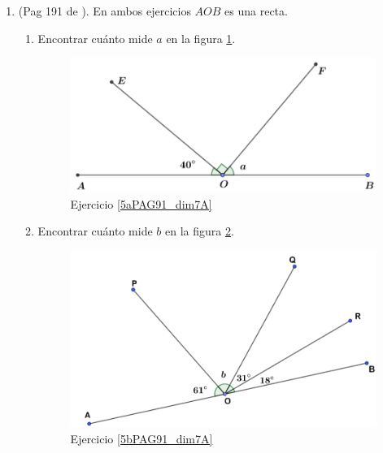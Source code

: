 \begin{enumerate}
	\item (Pag 191 de \cite{Dimensions_Math_7A}). En ambos ejercicios $AOB$ es una recta.
	\begin{enumerate}[label=\Alph*) ]
		\item \label{5aPAG91_dim7A}Encontrar cuánto mide $a$ en la figura \ref{dimensions_7A_p191_5a}.
		\begin{figure}[H]
			\centering
			\includegraphics[width=0.6\linewidth]{Geometria/imgs/dimensions_7A_p191_5a}
			\caption{Ejercicio \ref{5aPAG91_dim7A}}
			\label{dimensions_7A_p191_5a}
		\end{figure}
		\item \label{5bPAG91_dim7A}Encontrar cuánto mide $b$ en la figura \ref{dimensions_7A_p191_5b}.
		\begin{figure}[H]
			\centering
			\includegraphics[width=0.6\linewidth]{Geometria/imgs/dimensions_7A_p191_5b}
			\caption{Ejercicio \ref{5bPAG91_dim7A}}
			\label{dimensions_7A_p191_5b}
		\end{figure}
	\end{enumerate}	
	

\end{enumerate}
